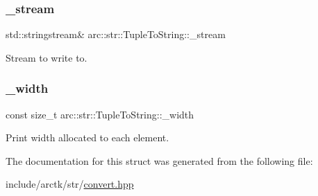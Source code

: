 \subsubsection{\texorpdfstring{\+\_\+stream}{\_stream}}
{\footnotesize\ttfamily std\+::stringstream\& arc\+::str\+::\+Tuple\+To\+String\+::\+\_\+stream\hspace{0.3cm}{\ttfamily [private]}}



Stream to write to. 

\mbox{\label{structarc_1_1str_1_1_tuple_to_string_aa99def2d3e4827b56a2bc8a9e4b08e1e}} 
\subsubsection{\texorpdfstring{\+\_\+width}{\_width}}
{\footnotesize\ttfamily const size\+\_\+t arc\+::str\+::\+Tuple\+To\+String\+::\+\_\+width\hspace{0.3cm}{\ttfamily [private]}}



Print width allocated to each element. 



The documentation for this struct was generated from the following file\+:\begin{DoxyCompactItemize}
\item 
include/arctk/str/\mbox{\hyperlink{convert_8hpp}{convert.\+hpp}}\end{DoxyCompactItemize}
